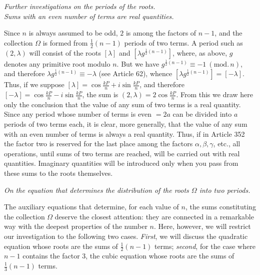 \begin{center}\itshape Further investigations on the periods of the roots.\\ Sums with an even number of terms are real quantities.\end{center}


Since \(n\) is always assumed to be odd, \(2\) is among the factors of \(n-1\), and the collection \(\Omega\) is formed from \(\frac12(n-1)\) periods of two terms. A period such as \((2,\lambda)\) will consist of the roots \([\lambda]\) and \([\lambda g^{\frac12(n-1)}]\), where, as above, \(g\) denotes any primitive root modulo \(n\). But we have \(g^{\frac12(n-1)}\equiv-1\ (\mathrm{mod.}\,n)\), and therefore \(\lambda g^{\frac12(n-1)}\equiv-\lambda\) (see Article 62), whence \([\lambda g^{\frac12(n-1)}]=[-\lambda]\). Thus, if we suppose \([\lambda]=\cos\frac{kP}{n}+i\sin\frac{kP}{n}\), and therefore \([-\lambda]=\cos\frac{kP}{n}-i\sin\frac{kP}{n}\), the sum is \((2,\lambda)=2\cos\frac{kP}{n}\). From this we draw here only the conclusion that the value of any sum of two terms is a real quantity. Since any period whose number of terms is even \(=2a\) can be divided into \(a\) periods of two terms each, it is clear, more generally, that the value of any sum
with an even number of terms is always a real quantity. Thus, if in Article 352 the factor two is reserved for the last place among the factors \(\alpha,\allowbreak \beta,\allowbreak \gamma\), etc., all operations, until sums of two terms are reached, will be carried out with real quantities. Imaginary quantities will be introduced only when you pass from these sums to the roots themselves.

\begin{center}\itshape On the equation that determines the distribution of the roots \(\Omega\) into two periods.\end{center}


The auxiliary equations that determine, for each value of \(n\), the sums constituting the collection \(\Omega\) deserve the closest attention: they are connected in a remarkable way with the deepest properties of the number \(n\). Here, however, we will restrict our investigation to the following two cases. \textit{First}, we will discuss the quadratic equation whose roots are the sums of \(\frac12(n-1)\) terms; \textit{second}, for the case where \(n-1\) contains the factor \(3\), the cubic equation whose roots are the sums of \(\frac13(n-1)\) terms.

